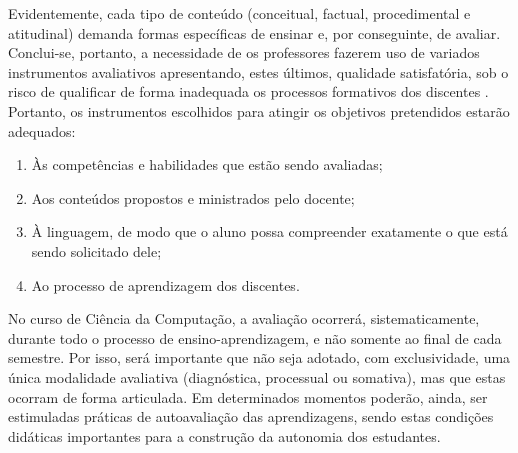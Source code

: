 \documentclass[
	12pt,				%
	openright,			%
  oneside,     %
	a4paper,			%
 hyphens,
	chapter=TITLE,		%
	english,			%
	french,				%
	spanish,			%
	brazil				%
	]{abntex2}
\begin{document}
Evidentemente, cada tipo de conteúdo (conceitual, factual, procedimental e atitudinal) demanda formas específicas de ensinar e, por conseguinte, de avaliar. Conclui-se, portanto, a necessidade de os professores fazerem uso de variados instrumentos avaliativos apresentando, estes últimos, qualidade satisfatória, sob o risco de qualificar de forma inadequada os processos formativos dos discentes \cite{da2003avaliaccao}. Portanto, os instrumentos escolhidos para atingir os objetivos pretendidos estarão adequados:

\begin{enumerate}[label=(\alph*)]
    \item Às competências e habilidades que estão sendo avaliadas;
    \item Aos conteúdos propostos e ministrados pelo docente; 
    \item À linguagem, de modo que o aluno possa compreender exatamente o que está sendo solicitado dele; 
    \item Ao processo de aprendizagem dos discentes.     
\end{enumerate}

No curso de Ciência da Computação, a avaliação ocorrerá, sistematicamente, durante todo o processo de ensino-aprendizagem, e não somente ao final de cada semestre. Por isso, será importante que não seja adotado, com exclusividade, uma única modalidade avaliativa (diagnóstica, processual ou somativa), mas que estas ocorram de forma articulada. Em determinados momentos poderão, ainda, ser estimuladas práticas de autoavaliação das aprendizagens, sendo estas condições didáticas importantes para a construção da autonomia dos estudantes.
\end{document}
